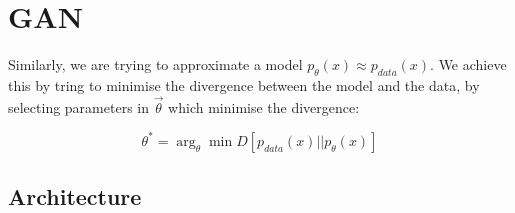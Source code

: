 \documentclass[11pt]{article}
\begin{document}
\section{GAN}

Similarly, we are trying to approximate a model $p_\theta(x) \approx p_{data}(x)$. We achieve this by tring to minimise the divergence between the model and the data, by selecting parameters in $\vec \theta$ which minimise the divergence:

\begin{equation}
    \theta^* = \arg_\theta \min D[p_{data}(x) || p_\theta(x)]
\end{equation}

\subsection{Architecture}

\begin{figure}[H]
    \centering
\end{figure}



\end{document}
